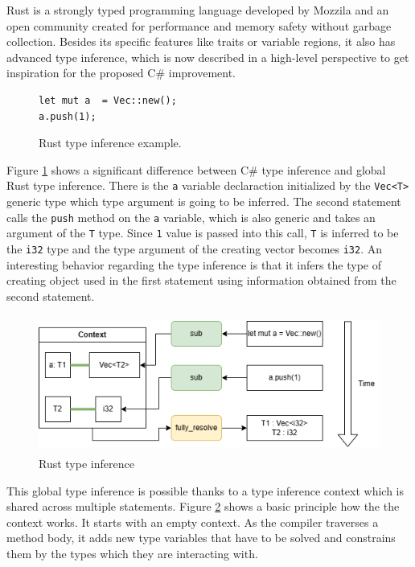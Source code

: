Rust is a strongly typed programming language developed by Mozzila and an open community created for performance and memory safety without garbage collection. 
Besides its specific features like traits or variable regions, it also has advanced type inference, which is now described in a high-level perspective to get inspiration for the proposed C\# improvement.
\par
\begin{figure}[h]
\begin{lstlisting}
let mut a  = Vec::new();
a.push(1);
\end{lstlisting}
\caption{Rust type inference example.}
\label{img17:rustCodeExample}
\end{figure}
Figure \ref{img17:rustCodeExample} shows a significant difference between C\# type inference and global Rust type inference.
There is the \texttt{a} variable declaraction initialized by the \texttt{Vec<T>} generic type which type argument is going to be inferred.
The second statement calls the \texttt{push} method on the \texttt{a} variable, which is also generic and takes an argument of the \texttt{T} type.
Since \texttt{1} value is passed into this call, \texttt{T} is inferred to be the \texttt{i32} type and the type argument of the creating vector becomes \texttt{i32}.
An interesting behavior regarding the type inference is that it infers the type of creating object used in the first statement using information obtained from the second statement.
\begin{figure}[h]
\centering
\includegraphics[width=120mm, height=45mm]{./img/RustTypeInference.png}
\caption{Rust type inference}
\label{img18:rustTypeInference}
\end{figure}
\par
\par
This global type inference is possible thanks to a type inference context which is shared across multiple statements. 
Figure \ref{img18:rustTypeInference} shows a basic principle how the the context works. 
It starts with an empty context. 
As the compiler traverses a method body, it adds new type variables that have to be solved and constrains them by the types which they are interacting with. 
